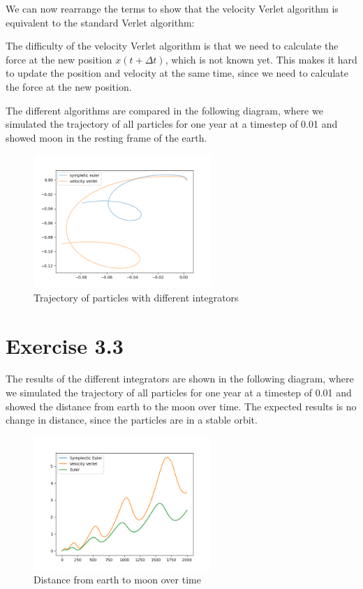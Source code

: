 \documentclass[a4paper,11pt,bibtotoc]{scrartcl}
\begin{document}
We can now rearrange the terms to show that the velocity Verlet algorithm is equivalent to the standard Verlet algorithm:


The difficulty of the velocity Verlet algorithm is that we need to calculate the force at the new position $x(t + \Delta t)$, which is not known yet.
This makes it hard to update the position and velocity at the same time, since we need to calculate the force at the new position.

The different algorithms are compared in the following diagram, where we simulated the trajectory of all particles for one year at a timestep of 0.01 and showed moon in the resting frame of the earth.
\begin{figure}[!htbp]
	\centering
	\includegraphics[width=0.6\textwidth]{ex_3_2_1.png}
	\caption{Trajectory of particles with different integrators}
	\label{fig:ex_3_2_1}
\end{figure}

\section{Exercise 3.3}

The results of the different integrators are shown in the following diagram, where we simulated the trajectory of all particles for one year at a timestep of 0.01 and showed the distance from earth to the moon over time.
The expected results is no change in distance, since the particles are in a stable orbit.

\begin{figure}[!htbp]
	\centering
	\includegraphics[width=0.6\textwidth]{ex_3_3_1.png}
	\caption{Distance from earth to moon over time}
	\label{fig:ex_3_3_1}
\end{figure}
\end{document}
